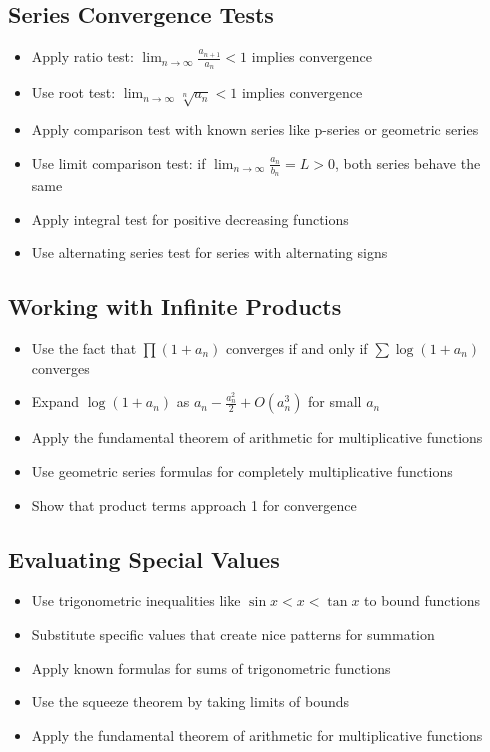 \subsection*{Series Convergence Tests}
\begin{itemize}
\item Apply ratio test: $\lim_{n\to\infty} \frac{a_{n+1}}{a_n} < 1$ implies convergence
\item Use root test: $\lim_{n\to\infty} \sqrt[n]{a_n} < 1$ implies convergence
\item Apply comparison test with known series like p-series or geometric series
\item Use limit comparison test: if $\lim_{n\to\infty} \frac{a_n}{b_n} = L > 0$, both series behave the same
\item Apply integral test for positive decreasing functions
\item Use alternating series test for series with alternating signs
\end{itemize}

\subsection*{Working with Infinite Products}
\begin{itemize}
\item Use the fact that $\prod(1+a_n)$ converges if and only if $\sum \log(1+a_n)$ converges
\item Expand $\log(1+a_n)$ as $a_n - \frac{a_n^2}{2} + O(a_n^3)$ for small $a_n$
\item Apply the fundamental theorem of arithmetic for multiplicative functions
\item Use geometric series formulas for completely multiplicative functions
\item Show that product terms approach 1 for convergence
\end{itemize}

\subsection*{Evaluating Special Values}
\begin{itemize}
\item Use trigonometric inequalities like $\sin x < x < \tan x$ to bound functions
\item Substitute specific values that create nice patterns for summation
\item Apply known formulas for sums of trigonometric functions
\item Use the squeeze theorem by taking limits of bounds
\item Apply the fundamental theorem of arithmetic for multiplicative functions
\end{itemize}